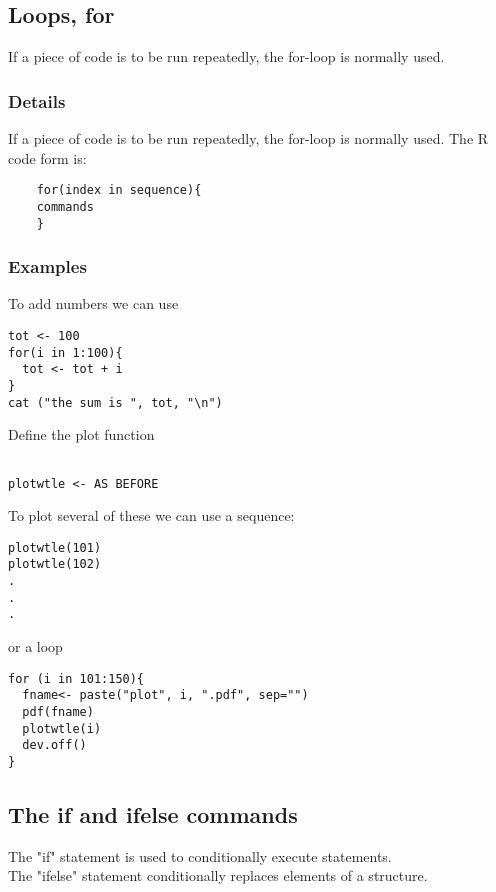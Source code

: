 \documentclass[12pt,a4paper]{article}
\theoremstyle{regla}
\theoremstyle{remark}
\theoremstyle{definition}
\theoremstyle{nonumberbreak}
\begin{document}
\subsection{Loops, for}
\begin{fbox}
\begin{minipage}{0.97\textwidth}
If a piece of code is to be run repeatedly, the for-loop is normally used. 
\end{minipage}
\end{fbox}
\subsubsection{Details}
If a piece of code is to be run repeatedly, the for-loop is normally used. The R code form is:
\begin{lstlisting}
	for(index in sequence){
	commands
	}
\end{lstlisting}
\subsubsection{Examples}
\begin{xmpl}
To add numbers we can use

\begin{lstlisting}
tot <- 100
for(i in 1:100){
  tot <- tot + i
}
cat ("the sum is ", tot, "\n")
\end{lstlisting}
\end{xmpl}
\begin{xmpl}

Define the plot function

\begin{lstlisting}

plotwtle <- AS BEFORE
\end{lstlisting}

To plot several of these we can use a sequence:
\begin{lstlisting}
plotwtle(101)
plotwtle(102)
.
.
.
\end{lstlisting}
or a loop
\begin{lstlisting}
for (i in 101:150){
  fname<- paste("plot", i, ".pdf", sep="")
  pdf(fname)
  plotwtle(i)
  dev.off()
}
\end{lstlisting}
\end{xmpl}

\subsection{The if and ifelse commands}
\begin{fbox}
\begin{minipage}{0.97\textwidth}
The "if" statement is used to conditionally execute statements.\\
The "ifelse" statement conditionally replaces elements of a structure.
\end{minipage}
\end{fbox}
\end{document}
